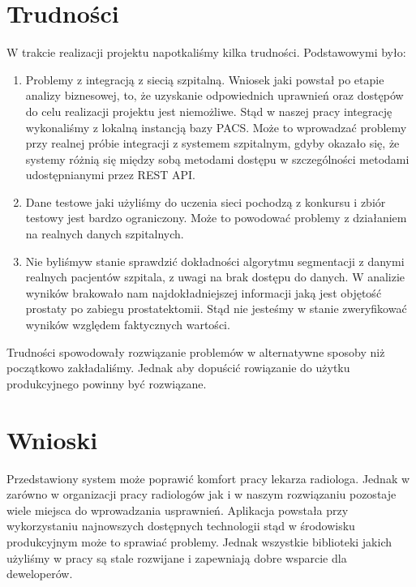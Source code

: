 \documentclass[a4paper,11pt,twoside]{report}
\theoremstyle{definition}
\begin{document}
\section{Trudności}
W trakcie realizacji projektu napotkaliśmy kilka trudności. Podstawowymi było:
\begin{enumerate}
\item Problemy z integracją z siecią szpitalną. Wniosek jaki powstał po etapie analizy biznesowej, to, że uzyskanie odpowiednich uprawnień oraz dostępów do celu realizacji projektu jest niemożliwe. Stąd w naszej pracy integrację wykonaliśmy z lokalną instancją bazy PACS. Może to wprowadzać problemy przy realnej próbie integracji z systemem szpitalnym, gdyby okazało się, że systemy różnią się między sobą metodami dostępu w szczególności metodami udostępnianymi przez REST API.
\item Dane testowe jaki użyliśmy do uczenia sieci pochodzą z konkursu i zbiór testowy jest bardzo ograniczony. Może to powodować problemy z działaniem na realnych danych szpitalnych. 
\item Nie byliśmyw stanie sprawdzić dokładności algorytmu segmentacji z danymi realnych pacjentów szpitala, z uwagi na brak dostępu do danych. W analizie wyników brakowało nam najdokładniejszej informacji jaką jest objętość prostaty po zabiegu prostatektomii. Stąd nie jesteśmy w stanie zweryfikować wyników względem faktycznych wartości.
\end{enumerate}
Trudności spowodowały rozwiązanie problemów w alternatywne sposoby niż początkowo zakładaliśmy. Jednak  aby dopuścić rowiązanie do użytku produkcyjnego powinny być rozwiązane. 

\section{Wnioski}
Przedstawiony system może poprawić komfort pracy lekarza radiologa. Jednak w zarówno w organizacji pracy radiologów jak i w naszym rozwiązaniu pozostaje wiele miejsca do wprowadzania usprawnień. Aplikacja powstała przy wykorzystaniu najnowszych dostępnych technologii stąd w środowisku produkcyjnym może to sprawiać problemy. Jednak wszystkie biblioteki jakich użyliśmy w pracy są stale rozwijane i zapewniają dobre wsparcie dla deweloperów.

\end{document}
